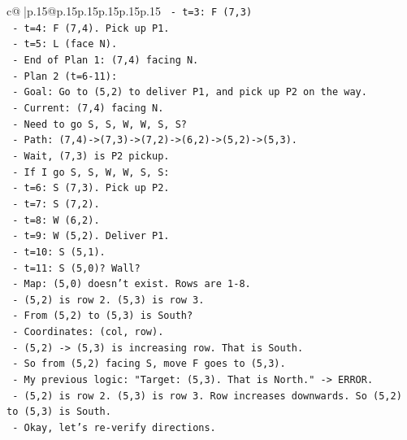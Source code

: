 \documentclass{article}
\begin{document}
{\begin{supertabular}{c@{$\;$}|p{.15\linewidth}@{}p{.15\linewidth}p{.15\linewidth}p{.15\linewidth}p{.15\linewidth}p{.15\linewidth}}
{{{\texttt{          {-} t=3: F (7,3)} \\
\texttt{          {-} t=4: F (7,4). Pick up P1.} \\
\texttt{          {-} t=5: L (face N).} \\
\texttt{          {-} End of Plan 1: (7,4) facing N.} \\
\texttt{        {-} Plan 2 (t=6{-}11):} \\
\texttt{          {-} Goal: Go to (5,2) to deliver P1, and pick up P2 on the way.} \\
\texttt{          {-} Current: (7,4) facing N.} \\
\texttt{          {-} Need to go S, S, W, W, S, S?} \\
\texttt{          {-} Path: (7,4){-}>(7,3){-}>(7,2){-}>(6,2){-}>(5,2){-}>(5,3).} \\
\texttt{          {-} Wait, (7,3) is P2 pickup.} \\
\texttt{          {-} If I go S, S, W, W, S, S:} \\
\texttt{            {-} t=6: S (7,3). Pick up P2.} \\
\texttt{            {-} t=7: S (7,2).} \\
\texttt{            {-} t=8: W (6,2).} \\
\texttt{            {-} t=9: W (5,2). Deliver P1.} \\
\texttt{            {-} t=10: S (5,1).} \\
\texttt{            {-} t=11: S (5,0)? Wall?} \\
\texttt{            {-} Map: (5,0) doesn't exist. Rows are 1{-}8.} \\
\texttt{            {-} (5,2) is row 2. (5,3) is row 3.} \\
\texttt{            {-} From (5,2) to (5,3) is South?} \\
\texttt{            {-} Coordinates: (col, row).} \\
\texttt{            {-} (5,2) {-}> (5,3) is increasing row. That is South.} \\
\texttt{            {-} So from (5,2) facing S, move F goes to (5,3).} \\
\texttt{            {-} My previous logic: "Target: (5,3). That is North." {-}> ERROR.} \\
\texttt{            {-} (5,2) is row 2. (5,3) is row 3. Row increases downwards. So (5,2) to (5,3) is South.} \\
\texttt{            {-} Okay, let's re{-}verify directions.} \\
}}}
\end{supertabular}}
\end{document}
